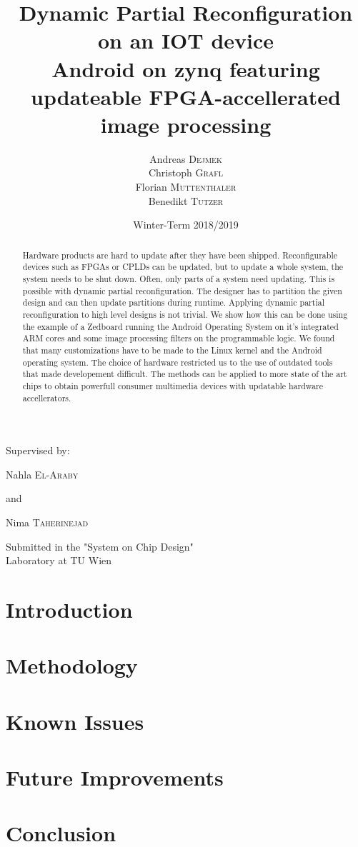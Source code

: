 \documentclass{article}
\title{Dynamic Partial Reconfiguration on an IOT device\\
\vspace{1em}
Android on zynq featuring updateable FPGA-accellerated image processing}
\author{Andreas \textsc{Dejmek}\\ Christoph \textsc{Grafl} \\
	Florian \textsc{Muttenthaler} \\ Benedikt \textsc{Tutzer}}
\date{Winter-Term 2018/2019}
\begin{document}
\maketitle
\begin{center}
	Supervised by:

	Nahla \textsc{El-Araby}

	and

	Nima \textsc{Taherinejad}
\end{center}
\begin{abstract}
	Hardware products are hard to update after they have been shipped.
	Reconfigurable devices such as FPGAs or CPLDs can be updated, but to
	update a whole system, the system needs to be shut down.
	Often, only parts of a system need updating.
	This is possible with dynamic partial reconfiguration.
	The designer has to partition the given design and can then update
	partitions during runtime.
	Applying dynamic partial reconfiguration to high level designs is not
	trivial.
	We show how this can be done using the example of a Zedboard running the
	Android Operating System on it's integrated ARM cores and some image
	processing filters on the programmable logic.
	We found that many customizations have to be made to the Linux kernel
	and the Android operating system.
	The choice of hardware restricted us to the use of outdated tools that
	made developement difficult.
	The methods can be applied to more state of the art chips to obtain
	powerfull consumer multimedia devices with updatable hardware
	accellerators.
\end{abstract}
\begin{center}
	Submitted in the "System on Chip Design"\\Laboratory at TU Wien


\end{center}
\pagebreak
\tableofcontents
\pagebreak
\section{Introduction}\label{sec:introduction}

\section{Methodology}\label{sec:methodology}

\section{Known Issues}\label{sec:knownissues}

\section{Future Improvements}\label{sec:futureimprovements}

\section{Conclusion}\label{sec:conclusion}



\end{document}
